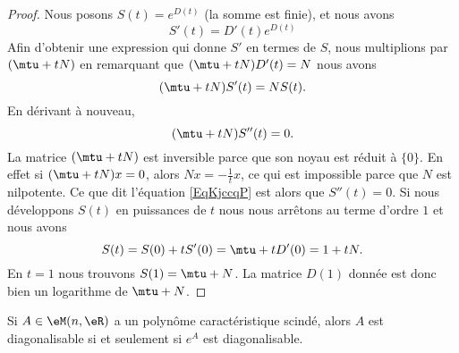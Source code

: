 \begin{proof}
    Nous posons \( S(t)= e^{D(t)}\) (la somme est finie), et nous avons
    \begin{equation}
        S'(t)=D'(t) e^{D(t)}
    \end{equation}
    Afin d'obtenir une expression qui donne \( S'\) en termes de \( S\), nous multiplions par \( (\mtu+tN)\) en remarquant que \( (\mtu+tN)D'(t)=N\) nous avons
    \begin{equation}
        (\mtu+tN)S'(t)=NS(t).
    \end{equation}
    En dérivant à nouveau,
    \begin{equation}    \label{EqKjccqP}
        (\mtu+tN)S''(t)=0.
    \end{equation}
    La matrice \( (\mtu+tN)\) est inversible parce que son noyau est réduit à \( \{ 0 \}\). En effet si \( (\mtu+tN)x=0\), alors \( Nx=-\frac{1}{ t }x\), ce qui est impossible parce que \( N\) est nilpotente. Ce que dit l'équation \eqref{EqKjccqP} est alors que \( S''(t)=0\). Si nous développons \( S(t)\) en puissances de \( t\) nous nous arrêtons au terme d'ordre \( 1\) et nous avons
    \begin{equation}
        S(t)=S(0)+tS'(0)=\mtu+tD'(0)=1+tN.
    \end{equation}
    En \( t=1\) nous trouvons \( S(1)=\mtu+N\). La matrice \( D(1)\) donnée est donc bien un logarithme de $\mtu+N$.
\end{proof}

\begin{proposition}
    Si \( A\in \eM(n,\eR)\) a un polynôme caractéristique scindé, alors \( A\) est diagonalisable si et seulement si \( e^A\) est diagonalisable.
\end{proposition}

